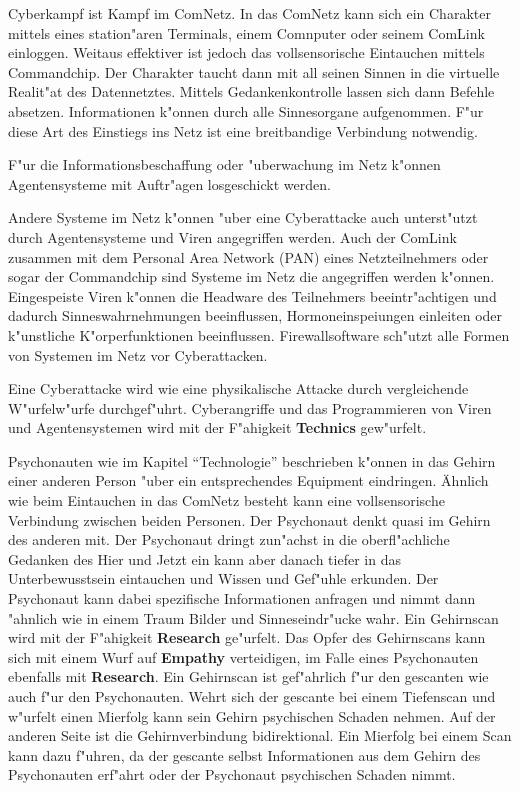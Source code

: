 Cyberkampf ist Kampf im ComNetz. In das ComNetz kann sich ein Charakter mittels eines station"aren Terminals, einem Comnputer oder seinem ComLink einloggen. Weitaus effektiver ist jedoch das vollsensorische Eintauchen mittels Commandchip. Der Charakter taucht dann mit all seinen Sinnen in die virtuelle Realit"at des Datennetztes. Mittels Gedankenkontrolle lassen sich dann Befehle absetzen. Informationen k"onnen durch alle Sinnesorgane aufgenommen. F"ur diese Art des Einstiegs ins Netz ist eine breitbandige Verbindung notwendig. 

F"ur die Informationsbeschaffung oder "uberwachung im Netz k"onnen Agentensysteme mit Auftr"agen losgeschickt werden. 

Andere Systeme im Netz k"onnen "uber eine Cyberattacke auch unterst"utzt durch Agentensysteme und Viren angegriffen werden. Auch der ComLink zusammen mit dem Personal Area Network (PAN) eines Netzteilnehmers oder sogar der Commandchip sind Systeme im Netz die angegriffen werden k"onnen. Eingespeiste Viren k"onnen die Headware des Teilnehmers beeintr"achtigen und dadurch Sinneswahrnehmungen beeinflussen, Hormoneinspei\3ungen einleiten oder k"unstliche K"orperfunktionen beeinflussen. Firewallsoftware sch"utzt alle Formen von Systemen im Netz vor Cyberattacken.

Eine Cyberattacke wird wie eine physikalische Attacke durch vergleichende W"urfelw"urfe durchgef"uhrt. Cyberangriffe und das Programmieren von Viren und Agentensystemen wird mit der F"ahigkeit \textbf{Technics} gew"urfelt.

Psychonauten wie im Kapitel "`Technologie"' beschrieben k"onnen in das Gehirn einer anderen Person "uber ein entsprechendes Equipment eindringen. Ähnlich wie beim Eintauchen in das ComNetz besteht kann eine vollsensorische Verbindung zwischen beiden Personen. Der Psychonaut denkt quasi im Gehirn des anderen mit. Der Psychonaut dringt zun"achst in die oberfl"achliche Gedanken des Hier und Jetzt ein kann aber danach tiefer in das Unterbewusstsein eintauchen und Wissen und Gef"uhle erkunden. Der Psychonaut kann dabei spezifische Informationen anfragen und nimmt dann "ahnlich wie in einem Traum Bilder und Sinneseindr"ucke wahr. Ein Gehirnscan wird mit der F"ahigkeit \textbf{Research} ge"urfelt. Das Opfer des Gehirnscans kann sich mit einem Wurf auf \textbf{Empathy} verteidigen, im Falle eines Psychonauten ebenfalls mit \textbf{Research}. Ein Gehirnscan ist gef"ahrlich f"ur den gescanten wie auch f"ur den Psychonauten. Wehrt sich der gescante bei einem Tiefenscan und w"urfelt einen Mi\3erfolg kann sein Gehirn psychischen Schaden nehmen. Auf der anderen Seite ist die Gehirnverbindung bidirektional. Ein Mi\3erfolg bei einem Scan kann dazu f"uhren, da\3 der gescante selbst Informationen aus dem Gehirn des Psychonauten erf"ahrt oder der Psychonaut psychischen Schaden nimmt.

